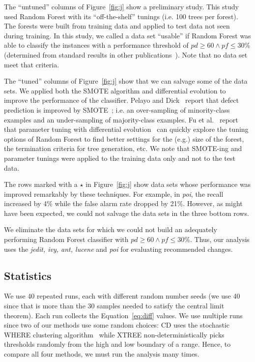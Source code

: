 \documentclass{sig-alternate}
\newcommand{\fig}[1]{Figure~\ref{fig:#1}}
\newcommand{\eq}[1]{Equation~\ref{eq:#1}}
\theoremstyle{break}
\begin{document}
\begin{itemize}
The ``untuned'' columns of \fig{j}
show a preliminary study. This study used
Random Forest with its ``off-the-shelf'' tunings (i.e.  
100 trees per forest).  
The forests were built from training data and applied to test data
not seen during training.  In this
study, we called a data set ``usable'' if   Random Forest was able to classify the instances with a performance threshold of $\mathit{pd}\ge 60 \wedge \mathit{pf} \le 30$\% (determined from standard results in other publications~\cite{me07b}). Note that no  data set meet
that criteria.

The ``tuned'' columns of \fig{j} show that we can salvage some of the data sets. We applied both the SMOTE algorithm and differential evolution to improve the performance of the classifier. Pelayo and Dick~\cite{pelayo07} report that defect prediction is improved by SMOTE~\cite{Chawla2002}; i.e. an over-sampling of minority-class examples and an under-sampling of majority-class examples. Fu et al.~\cite{fu:ase15} report that parameter tuning with differential evolution~\cite{storn97} can quickly explore the tuning options of Random Forest to find better settings for the (e.g.) size of the forest, the termination criteria
for tree generation, etc. We note that SMOTE-ing and
parameter tunings were applied to the training data only and not to the test data.

The rows \colorbox{celadon}{marked with a $\star$} in \fig{j} show data sets whose performance was improved remarkably by these techniques. For example, in {\em poi}, the recall increased by 4\% while the false alarm rate dropped by 21\%. However, as might have been expected, we could not salvage the data sets in the  three bottom rows.

We eliminate the data sets for which we could not build an adequately performing Random Forest classifier with $\mathit{pd}\ge 60 \wedge \mathit{pf} \le 30$\%. Thus, our analysis uses the {\em jedit, ivy, ant, lucene} and {\em poi} for evaluating recommended changes.




\subsection{Statistics}


We use 40 repeated runs, each with different random number seeds (we use 40 since that is  more than the 30 samples  needed to satisfy the central limit theorem). Each run collects the \eq{diff} values.
We use multiple runs since two of our methods use some random choices: CD uses the  stochastic WHERE clustering algorithm~\cite{localvsglobal}
while XTREE non-deterministically picks thresholds randomly from
the high and low boundary of a range. 
 Hence, to compare all
four methods, we must run the analysis many times. 




\end{itemize}
\end{document}
